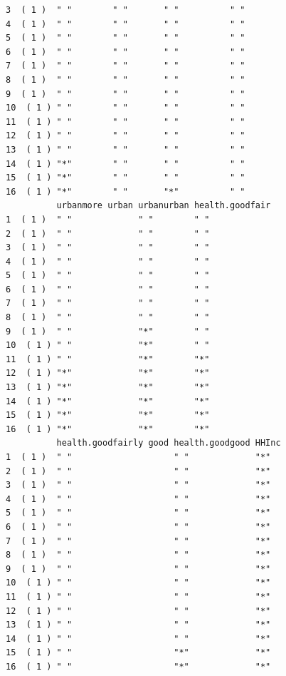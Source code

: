 \documentclass[]{article}
\begin{document}
\begin{verbatim}
3  ( 1 )  " "        " "       " "          " "            
4  ( 1 )  " "        " "       " "          " "            
5  ( 1 )  " "        " "       " "          " "            
6  ( 1 )  " "        " "       " "          " "            
7  ( 1 )  " "        " "       " "          " "            
8  ( 1 )  " "        " "       " "          " "            
9  ( 1 )  " "        " "       " "          " "            
10  ( 1 ) " "        " "       " "          " "            
11  ( 1 ) " "        " "       " "          " "            
12  ( 1 ) " "        " "       " "          " "            
13  ( 1 ) " "        " "       " "          " "            
14  ( 1 ) "*"        " "       " "          " "            
15  ( 1 ) "*"        " "       " "          " "            
16  ( 1 ) "*"        " "       "*"          " "            
          urbanmore urban urbanurban health.goodfair
1  ( 1 )  " "             " "        " "            
2  ( 1 )  " "             " "        " "            
3  ( 1 )  " "             " "        " "            
4  ( 1 )  " "             " "        " "            
5  ( 1 )  " "             " "        " "            
6  ( 1 )  " "             " "        " "            
7  ( 1 )  " "             " "        " "            
8  ( 1 )  " "             " "        " "            
9  ( 1 )  " "             "*"        " "            
10  ( 1 ) " "             "*"        " "            
11  ( 1 ) " "             "*"        "*"            
12  ( 1 ) "*"             "*"        "*"            
13  ( 1 ) "*"             "*"        "*"            
14  ( 1 ) "*"             "*"        "*"            
15  ( 1 ) "*"             "*"        "*"            
16  ( 1 ) "*"             "*"        "*"            
          health.goodfairly good health.goodgood HHInc
1  ( 1 )  " "                    " "             "*"  
2  ( 1 )  " "                    " "             "*"  
3  ( 1 )  " "                    " "             "*"  
4  ( 1 )  " "                    " "             "*"  
5  ( 1 )  " "                    " "             "*"  
6  ( 1 )  " "                    " "             "*"  
7  ( 1 )  " "                    " "             "*"  
8  ( 1 )  " "                    " "             "*"  
9  ( 1 )  " "                    " "             "*"  
10  ( 1 ) " "                    " "             "*"  
11  ( 1 ) " "                    " "             "*"  
12  ( 1 ) " "                    " "             "*"  
13  ( 1 ) " "                    " "             "*"  
14  ( 1 ) " "                    " "             "*"  
15  ( 1 ) " "                    "*"             "*"  
16  ( 1 ) " "                    "*"             "*"  
\end{verbatim}
\end{document}
